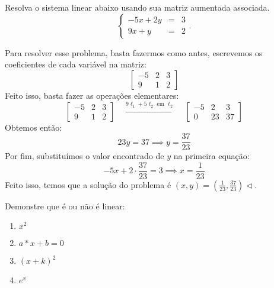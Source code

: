 \begin{exeresol}
Resolva o sistema linear abaixo usando sua matriz aumentada associada.
\begin{equation}
  \left\{
    \begin{array}{rcl}
      -5x+2y&=&3 \\
      9x+y&=&2
    \end{array}
  \right..
\end{equation}
\end{exeresol}
\begin{resol}
Para resolver esse problema, basta fazermos como antes, escrevemos os coeficientes de cada variável na matriz:
\begin{equation}
 \left[
  \begin{array}{cc|c}
    -5 &  2 & 3 \\
    9 & 1 & 2
  \end{array}
\right]
\end{equation}
Feito isso, basta fazer as operações elementares:
\begin{equation}
 \left[
  \begin{array}{cc|c}
    -5 &  2 & 3 \\
    9 & 1 & 2
  \end{array}
\right]
\quad \xrightarrow{9\ell_1 + 5\ell_2 \text{ em } \ell_2} \quad
 \left[
  \begin{array}{cc|c}
    -5 &  2 & 3 \\
    0 & 23 & 37
  \end{array}
\right]
\end{equation}
Obtemos então:
\begin{equation}
23y = 37 \implies y = \frac{37}{23}
\end{equation}
Por fim, substituímos o valor encontrado de $y$ na primeira equação:
\begin{equation}
 -5x + 2\cdot \frac{37}{23} = 3 \implies x = \frac{1}{23}
\end{equation}
Feito isso, temos que a solução do problema é $(x,y) = (\frac{1}{23}, \frac{37}{23}) \lhd$.
\end{resol}
\begin{exeresol}
        Demonstre que é ou não é linear:
            \begin{enumerate}
                \item $x^{2}$
                \item $a*x + b = 0$
                \item $(x + k)^{2}$
                \item $e^{x}$
            \end{enumerate}
\end{exeresol}
